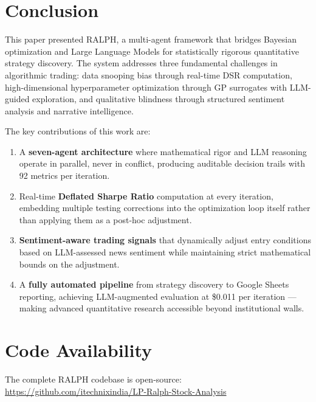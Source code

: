 \documentclass[conference]{IEEEtran}
\begin{document}
\section{Conclusion}
\label{sec:conclusion}

This paper presented RALPH, a multi-agent framework that bridges Bayesian optimization and Large Language Models for statistically rigorous quantitative strategy discovery. The system addresses three fundamental challenges in algorithmic trading: data snooping bias through real-time DSR computation, high-dimensional hyperparameter optimization through GP surrogates with LLM-guided exploration, and qualitative blindness through structured sentiment analysis and narrative intelligence.

The key contributions of this work are:
\begin{enumerate}
    \item A \textbf{seven-agent architecture} where mathematical rigor and LLM reasoning operate in parallel, never in conflict, producing auditable decision trails with 92 metrics per iteration.
    \item Real-time \textbf{Deflated Sharpe Ratio} computation at every iteration, embedding multiple testing corrections into the optimization loop itself rather than applying them as a post-hoc adjustment.
    \item \textbf{Sentiment-aware trading signals} that dynamically adjust entry conditions based on LLM-assessed news sentiment while maintaining strict mathematical bounds on the adjustment.
    \item A \textbf{fully automated pipeline} from strategy discovery to Google Sheets reporting, achieving LLM-augmented evaluation at \$0.011 per iteration --- making advanced quantitative research accessible beyond institutional walls.
\end{enumerate}

\section*{Code Availability}
The complete RALPH codebase is open-source: \url{https://github.com/itechnixindia/LP-Ralph-Stock-Analysis}
\end{document}
